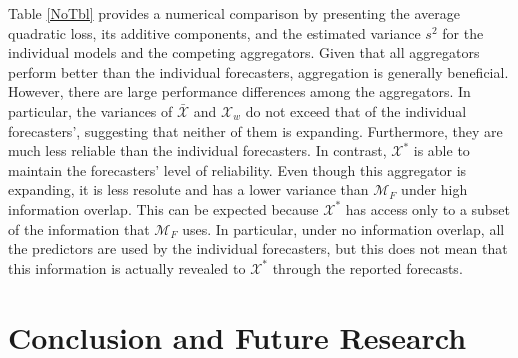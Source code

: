 \documentclass[11pt]{article}
\theoremstyle{definition}
\theoremstyle{definition}
\begin{document}
%
Table \ref{NoTbl} provides a numerical comparison by presenting the average quadratic loss, its additive components, and the estimated variance $s^2$ for the individual models and the competing aggregators.  Given that all aggregators perform better than the individual forecasters, aggregation is generally beneficial. However, there are large performance differences among the aggregators. In particular, the variances of $\bar{\mathcal{X}}$ and $\mathcal{X}_w$  do not exceed that of the individual forecasters', suggesting that neither of them is expanding. Furthermore, they are much less reliable than the individual forecasters. In contrast, $\mathcal{X}^*$ is able to maintain the forecasters' level of reliability. Even though this aggregator is expanding, it is less resolute and has a lower variance than $\mathcal{M}_F$ under high information overlap. This can be expected because $\mathcal{X}^*$ has access only to a subset of the information that $\mathcal{M}_F$ uses. In particular, under no information overlap, all the predictors are  used by the individual forecasters, but this does not mean that this information is actually revealed to $\mathcal{X}^*$ through the reported forecasts. 

\section{Conclusion and Future Research} \label{conclusion}
\end{document}
